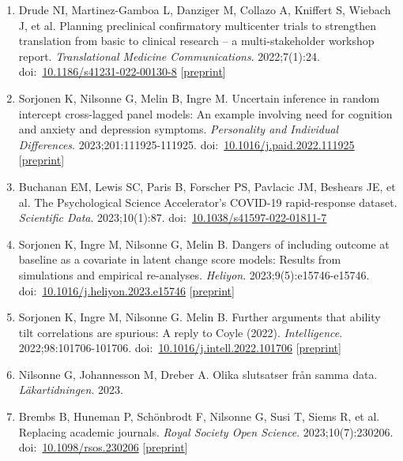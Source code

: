 \documentclass[10pt,a4paper,twocolumn]{article}
\begin{document}
\begin{enumerate}
    \item Drude NI, Martinez-Gamboa L, Danziger M, Collazo A, Kniffert S, Wiebach J, et al. Planning preclinical confirmatory multicenter trials to strengthen translation from basic to clinical research – a multi-stakeholder workshop report. \textit{Translational Medicine Communications}. 2022;7(1):24. doi:~\href{https://doi.org/10.1186/s41231-022-00130-8}{10.1186/s41231-022-00130-8} [\href{https://doi.org/10.21203/rs.3.rs-1855244/v1}{preprint}]

    \item Sorjonen K, Nilsonne G, Melin B, Ingre M. Uncertain inference in random intercept cross-lagged panel models: An example involving need for cognition and anxiety and depression symptoms. \textit{Personality and Individual Differences}. 2023;201:111925-111925. doi:~\href{https://doi.org/10.1016/j.paid.2022.111925}{10.1016/j.paid.2022.111925} [\href{https://doi.org/10.31234/osf.io/2a5gp}{preprint}]

    \item Buchanan EM, Lewis SC, Paris B, Forscher PS, Pavlacic JM, Beshears JE, et al. The Psychological Science Accelerator’s COVID-19 rapid-response dataset. \textit{Scientific Data}. 2023;10(1):87. doi:~\href{https://doi.org/10.1038/s41597-022-01811-7}{10.1038/s41597-022-01811-7}

    \item Sorjonen K, Ingre M, Nilsonne G, Melin B. Dangers of including outcome at baseline as a covariate in latent change score models: Results from simulations and empirical re-analyses. \textit{Heliyon}. 2023;9(5):e15746-e15746. doi:~\href{https://doi.org/10.1016/j.heliyon.2023.e15746}{10.1016/j.heliyon.2023.e15746} [\href{https://doi.org/10.31234/osf.io/2sxja}{preprint}]

    \item Sorjonen K, Ingre M, Nilsonne G. Melin B. Further arguments that ability tilt correlations are spurious: A reply to Coyle (2022). \textit{Intelligence}. 2022;98:101706-101706. doi:~\href{https://doi.org/10.1016/j.intell.2022.101706}{10.1016/j.intell.2022.101706} [\href{https://doi.org/10.31234/osf.io/7vhnz}{preprint}]

    \item Nilsonne G, Johannesson M, Dreber A. Olika slutsatser från samma data. \textit{Läkartidningen}. 2023.

    \item Brembs B, Huneman P, Schönbrodt F, Nilsonne G, Susi T, Siems R, et al. Replacing academic journals. \textit{Royal Society Open Science}. 2023;10(7):230206. doi:~\href{https://doi.org/10.1098/rsos.230206}{10.1098/rsos.230206} [\href{https://doi.org/10.5281/zenodo.7974116}{preprint}]


\end{enumerate}
\end{document}

